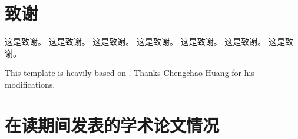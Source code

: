 \documentclass[UTF8,openright]{ctexbook}
\begin{document}
\clearpage{\pagestyle{empty}\cleardoublepage}
\backmatter

\fancyfoot[CO,CE]{{\thepage}}
\backmatter%
\chapter*{ }
\setlength{\bibsep}{0.5ex} %
\linespread{1.2}\selectfont
{}



\clearpage{\pagestyle{empty}\cleardoublepage}
\chapter*{致谢}

这是致谢。
这是致谢。
这是致谢。
这是致谢。
这是致谢。
这是致谢。
这是致谢。

This template is heavily based on \citep{ecnu-thesis}. 
Thanks Chengchao Huang for his modifications.

\clearpage{\pagestyle{empty}\cleardoublepage}
\chapter*{在读期间发表的学术论文情况}
% 




\newpage
\pagestyle{plain}
\fancyhf{}
% 
\end{document}
